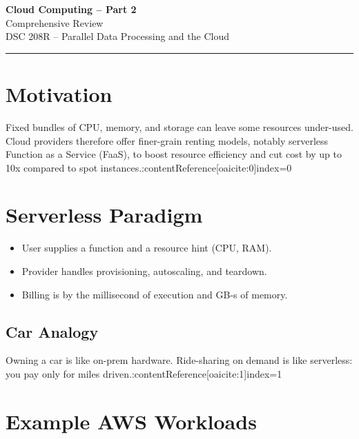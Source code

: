 \documentclass[11pt]{article}
\begin{document}
\begin{center}
  {\LARGE\bfseries Cloud Computing -- Part 2}\\[1.5mm]
  {\large Comprehensive Review}\\[0.7mm]
  {\normalsize DSC 208R -- Parallel Data Processing and the Cloud}
\end{center}
\vspace{-0.6em}\hrule\vspace{0.9em}

\tableofcontents
\newpage

\section{Motivation}

Fixed bundles of CPU, memory, and storage can leave some resources under-used.  
Cloud providers therefore offer finer-grain renting models, notably
serverless Function as a Service (FaaS), to boost resource efficiency and cut cost by up to 10x compared to spot instances.:contentReference[oaicite:0]{index=0}

\section{Serverless Paradigm}

\begin{itemize}[itemsep=0pt]
  \item User supplies a function and a resource hint (CPU, RAM).
  \item Provider handles provisioning, autoscaling, and teardown.
  \item Billing is by the millisecond of execution and GB-s of memory.
\end{itemize}

\subsection*{Car Analogy}

Owning a car is like on-prem hardware.  
Ride-sharing on demand is like serverless: you pay only for miles driven.:contentReference[oaicite:1]{index=1}

\section{Example AWS Workloads}
\end{document}
